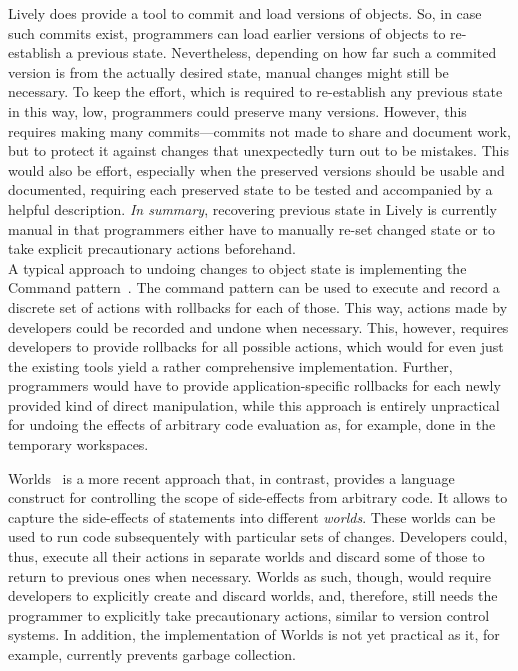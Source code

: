 Lively does provide a tool to commit and load versions of objects.
So, in case such commits exist, programmers can load earlier versions of objects to re-establish a previous state.
Nevertheless, depending on how far such a commited version is from the actually desired state, manual changes might still be necessary.
To keep the effort, which is required to re-establish any previous state in this way, low, programmers could preserve many versions.
However, this requires making many commits---commits not made to share and document work, but to protect it against changes that unexpectedly turn out to be mistakes.
This would also be effort, especially when the preserved versions should be usable and documented, requiring each preserved state to be tested and accompanied by a helpful description.
\emph{In summary}, recovering previous state in Lively is currently manual in that programmers either have to manually re-set changed state or to take explicit precautionary actions beforehand. \\

A typical approach to undoing changes to object state is implementing the Command pattern~\cite{GammaHelmJohnsonVlissides95}.
The command pattern can be used to execute and record a discrete set of actions with rollbacks for each of those.
This way, actions made by developers could be recorded and undone when necessary.
This, however, requires developers to provide rollbacks for all possible actions, which would for even just the existing tools yield a rather comprehensive implementation.
Further, programmers would have to provide application-specific rollbacks for each newly provided kind of direct manipulation, while this approach is entirely unpractical for undoing the effects of arbitrary code evaluation as, for example, done in the temporary workspaces.

Worlds~\cite{Warth2011Wor} is a more recent approach that, in contrast, provides a language construct for controlling the scope of side-effects from arbitrary code.
It allows to capture the side-effects of statements into different \emph{worlds}.
These worlds can be used to run code subsequentely with particular sets of changes.
Developers could, thus, execute all their actions in separate worlds and discard some of those to return to previous ones when necessary.
Worlds as such, though, would require developers to explicitly create and discard worlds, and, therefore, still needs the programmer to explicitly take precautionary actions, similar to version control systems.
In addition, the implementation of Worlds is not yet practical as it, for example, currently prevents garbage collection. \\

